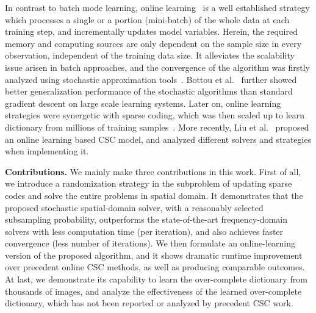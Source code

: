 In contrast to batch mode learning, online learning~\cite{shalev2012online} is a well established strategy which processes a single or a portion (mini-batch) of the whole data at each training step, and incrementally updates model variables. Herein, the required memory and computing sources are only dependent on the sample size in every observation, independent of the training data size. It alleviates the scalability issue arisen in batch approaches, and the convergence of the algorithm was firstly analyzed using stochastic approximation tools~\cite{bottou1998online}. Bottou et al.~\cite{bousquet2008tradeoffs} further showed better generalization performance of the stochastic algorithms than standard gradient descent on large scale learning systems. Later on, online learning strategies were synergetic with sparse coding, which was then scaled up to learn dictionary from millions of training samples~\cite{mairal2009online,mairal2010online}. More recently, Liu et al.~\cite{liu-2018-first} proposed an online learning based CSC model, and analyzed different solvers and strategies when implementing it.

{\bfseries Contributions.} We mainly make three contributions in this work. First of all, we introduce a randomization strategy in the subproblem of updating sparse codes and solve the entire problems in spatial domain. It demonstrates that the proposed stochastic spatial-domain solver, with a reasonably selected subsampling probability, outperforms the state-of-the-art frequency-domain solvers with less computation time (per iteration), and also achieves faster convergence (less number of iterations). We then formulate an online-learning version of the proposed algorithm, and it shows dramatic runtime improvement over precedent online CSC methods, as well as producing comparable outcomes. At last, we demonstrate its capability to learn the over-complete dictionary from thousands of images, and analyze the effectiveness of the learned over-complete dictionary, which has not been reported or analyzed by precedent CSC work.
